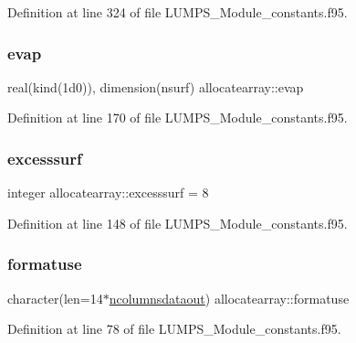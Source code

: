 Definition at line 324 of file L\+U\+M\+P\+S\+\_\+\+Module\+\_\+constants.\+f95.

\mbox{\label{namespaceallocatearray_a91095edf69a936902a3586fe9ef958a3}} 
\subsubsection{\texorpdfstring{evap}{evap}}
{\footnotesize\ttfamily real(kind(1d0)), dimension(nsurf) allocatearray\+::evap}



Definition at line 170 of file L\+U\+M\+P\+S\+\_\+\+Module\+\_\+constants.\+f95.

\mbox{\label{namespaceallocatearray_a4cc417e12e2821c143a2687fd02be496}} 
\subsubsection{\texorpdfstring{excesssurf}{excesssurf}}
{\footnotesize\ttfamily integer allocatearray\+::excesssurf = 8}



Definition at line 148 of file L\+U\+M\+P\+S\+\_\+\+Module\+\_\+constants.\+f95.

\mbox{\label{namespaceallocatearray_ab9823e63bd1fbe6b3a03661b3f184848}} 
\subsubsection{\texorpdfstring{formatuse}{formatuse}}
{\footnotesize\ttfamily character(len=14$\ast$\hyperlink{namespaceallocatearray_a9408900bed6c87ed095d2c688c1506a0}{ncolumnsdataout}) allocatearray\+::formatuse}



Definition at line 78 of file L\+U\+M\+P\+S\+\_\+\+Module\+\_\+constants.\+f95.

\mbox{\label{namespaceallocatearray_a0e59779b2c97266957b8575e9b411e97}} 
